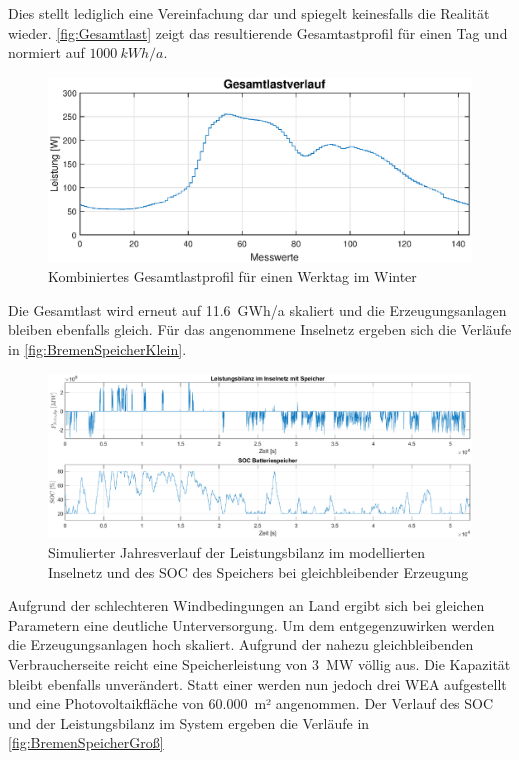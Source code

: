 Dies stellt lediglich eine Vereinfachung dar und spiegelt keinesfalls die Realität wieder. \autoref{fig:Gesamtlast} zeigt das resultierende Gesamtastprofil für einen Tag und normiert auf $1000~kWh/a$.

\begin{figure}[H]
	\centering
	\includegraphics[width=0.8\linewidth]{Abbildungen/Gesamtlast.eps}
	\caption{Kombiniertes Gesamtlastprofil für einen Werktag im Winter}
	\label{fig:Gesamtlast}
\end{figure}

Die Gesamtlast wird erneut auf 11.6~GWh/a skaliert und die Erzeugungsanlagen bleiben ebenfalls gleich. Für das angenommene Inselnetz ergeben sich die Verläufe  in \autoref{fig:BremenSpeicherKlein}.

\begin{figure}[H]
	\centering
	\includegraphics[width=0.8\linewidth]{Abbildungen/BremenSpeicherKlein.eps}
	\caption{Simulierter Jahresverlauf der Leistungsbilanz im modellierten Inselnetz und des SOC des Speichers bei gleichbleibender Erzeugung}
	\label{fig:BremenSpeicherKlein}
\end{figure}

Aufgrund der schlechteren Windbedingungen an Land ergibt sich bei gleichen Parametern eine deutliche Unterversorgung. Um dem entgegenzuwirken werden die Erzeugungsanlagen hoch skaliert. Aufgrund der nahezu gleichbleibenden Verbraucherseite reicht eine Speicherleistung von 3~MW völlig aus. Die Kapazität bleibt ebenfalls unverändert. Statt einer werden nun jedoch drei WEA aufgestellt und eine Photovoltaikfläche von 60.000~m² angenommen. Der Verlauf des SOC und der Leistungsbilanz im System ergeben die Verläufe in \autoref{fig:BremenSpeicherGroß}

